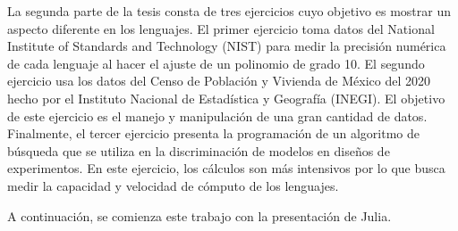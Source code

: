 La segunda parte de la tesis consta de tres ejercicios cuyo objetivo es mostrar un aspecto diferente en los lenguajes. El primer ejercicio toma datos del National Institute of Standards and Technology (NIST) para medir la precisión numérica de cada lenguaje al hacer el ajuste de un polinomio de grado 10. El segundo ejercicio usa los datos del Censo de Población y Vivienda de México del 2020 hecho por el Instituto Nacional de Estadística y Geografía (INEGI). El objetivo de este ejercicio es el manejo y manipulación de una gran cantidad de datos. Finalmente, el tercer ejercicio presenta la programación de un algoritmo de búsqueda que se utiliza en la discriminación de modelos en diseños de experimentos. En este ejercicio, los cálculos son más intensivos por lo que busca medir la capacidad y velocidad de cómputo de los lenguajes. 

A continuación, se comienza este trabajo con la presentación de \textsf{Julia}. 



